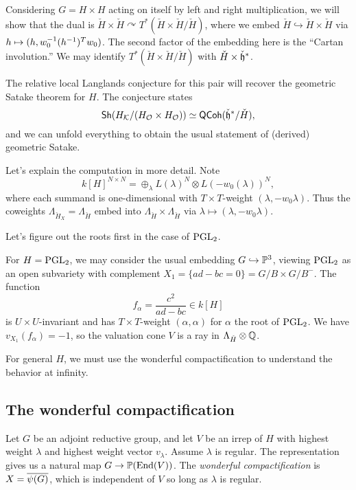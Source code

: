 \documentclass{article}
\begin{document}
Considering $G = H \times H$ acting on itself by left and right multiplication, we will show that the dual is $\check{H} \times \check{H} \curvearrowright T^*(\check{H} \times \check{H} / \check{H})$, where we embed $\check{H} \hookrightarrow \check{H} \times \check{H}$ via $h \mapsto (h, w_0^{-1} (h^{-1})^T w_0)$.
The second factor of the embedding here is the ``Cartan involution.''
We may identify $T^*(\check{H} \times \check{H} / \check{H})$ with $\check{H} \times \check{\mathfrak{h}}^*$.

The relative local Langlands conjecture for this pair will recover the geometric Satake theorem for $H$.
The conjecture states
\[
	\mathsf{Sh}(H_{\mathcal{K}} / (H_{\mathcal{O}} \times H_{\mathcal{O}})) \simeq \mathsf{QCoh}(\check{\mathfrak{h}}^* / \check{H}),
\]
and we can unfold everything to obtain the usual statement of (derived) geometric Satake.

Let's explain the computation in more detail.
Note
\[
	k[H]^{N \times N} = \oplus_{\lambda} L(\lambda)^N \otimes L(-w_0(\lambda))^N,
\]
where each summand is one-dimensional with $T \times T$-weight $(\lambda, -w_0 \lambda)$.
Thus the coweights $\Lambda_{\check{H}_X} = \Lambda_{\check{H}}$ embed into $\Lambda_{\check{H}} \times \Lambda_{\check{H}}$ via $\lambda \mapsto (\lambda, -w_0 \lambda)$.

Let's figure out the roots first in the case of $\operatorname{PGL}_2$.

\begin{ex}
	For $H = \operatorname{PGL}_2$, we may consider the usual embedding $G \hookrightarrow \mathbb{P}^3$, viewing $\operatorname{PGL}_2$ as an open subvariety with complement $X_1 = \{ ad - bc = 0 \} = G/B \times G/B^-$.
	The function
	\[
		f_\alpha = \frac{c^2}{ad-bc} \in k[H]
	\]
	is $U \times U$-invariant and has $T \times T$-weight $(\alpha, \alpha)$ for $\alpha$ the root of $\operatorname{PGL}_2$.
	We have $v_{X_1}(f_\alpha) = -1$, so the valuation cone $V$ is a ray in $\Lambda_{\check{H}} \otimes \mathbb{Q}$.
\end{ex}

For general $H$, we must use the wonderful compactification to understand the behavior at infinity.

\subsection{The wonderful compactification}

Let $G$ be an adjoint reductive group, and let $V$ be an irrep of $H$ with highest weight $\lambda$ and highest weight vector $v_\lambda$.
Assume $\lambda$ is regular.
The representation gives us a natural map $G \to \mathbb{P}(\operatorname{End}(V))$.
The \emph{wonderful compactification} is $X = \overline{\psi(G)}$, which is independent of $V$ so long as $\lambda$ is regular.
\end{document}
